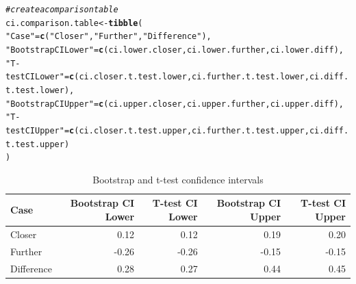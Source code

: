 \documentclass{article}\usepackage[]{graphicx}\usepackage[]{xcolor}
\makeatletter
\newcommand{\hlsng}[1]{\textcolor[rgb]{0.192,0.494,0.8}{#1}}%
\newcommand{\hlcom}[1]{\textcolor[rgb]{0.678,0.584,0.686}{\textit{#1}}}%
\newcommand{\hldef}[1]{\textcolor[rgb]{0.345,0.345,0.345}{#1}}%
\newcommand{\hlkwb}[1]{\textcolor[rgb]{0.69,0.353,0.396}{#1}}%
\newcommand{\hlkwd}[1]{\textcolor[rgb]{0.737,0.353,0.396}{\textbf{#1}}}%
\newenvironment{kframe}{%
 \def\at@end@of@kframe{}%
 \ifinner\ifhmode%
  \def\at@end@of@kframe{\end{minipage}}%
  \begin{minipage}{\columnwidth}%
 \fi\fi%
 \def\FrameCommand##1{\hskip\@totalleftmargin \hskip-\fboxsep
 \colorbox{shadecolor}{##1}\hskip-\fboxsep
     \hskip-\linewidth \hskip-\@totalleftmargin \hskip\columnwidth}%
 \MakeFramed {\advance\hsize-\width
   \@totalleftmargin\z@ \linewidth\hsize
   \@setminipage}}%
 {\par\unskip\endMakeFramed%
 \at@end@of@kframe}
\newenvironment{knitrout}{}{} %
\makeatother
\begin{document}
\begin{enumerate}
\begin{enumerate}
\begin{knitrout}
\begin{kframe}
\begin{alltt}
\hlcom{#create a comparison table}
\hldef{ci.comparison.table} \hlkwb{<-} \hlkwd{tibble}\hldef{(}
\hlsng{"Case"} \hldef{=} \hlkwd{c}\hldef{(}\hlsng{"Closer"}\hldef{,} \hlsng{"Further"}\hldef{,} \hlsng{"Difference"}\hldef{),}
\hlsng{"Bootstrap CI Lower"} \hldef{=} \hlkwd{c}\hldef{(ci.lower.closer, ci.lower.further, ci.lower.diff),}
\hlsng{"T-test CI Lower"} \hldef{=} \hlkwd{c}\hldef{(ci.closer.t.test.lower, ci.further.t.test.lower, ci.diff.t.test.lower),}
\hlsng{"Bootstrap CI Upper"} \hldef{=} \hlkwd{c}\hldef{(ci.upper.closer, ci.upper.further, ci.upper.diff),}
\hlsng{"T-test CI Upper"} \hldef{=} \hlkwd{c}\hldef{(ci.closer.t.test.upper, ci.further.t.test.upper, ci.diff.t.test.upper)}
\hldef{)}
\end{alltt}
\end{kframe}
\end{knitrout}
\begin{table}[ht]
\centering
\begin{tabular}{lrrrr}
  \hline
Case & Bootstrap CI Lower & T-test CI Lower & Bootstrap CI Upper & T-test CI Upper \\ 
  \hline
Closer & 0.12 & 0.12 & 0.19 & 0.20 \\ 
  Further & -0.26 & -0.26 & -0.15 & -0.15 \\ 
  Difference & 0.28 & 0.27 & 0.44 & 0.45 \\ 
   \hline
\end{tabular}
\caption{Bootstrap and t-test confidence intervals} 
\end{table}


\end{enumerate}
\end{enumerate}
\end{document}
